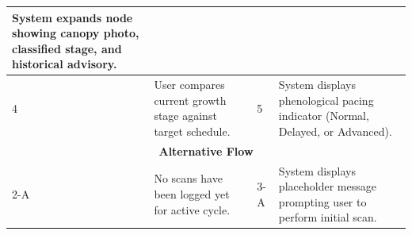 \documentclass{FastFyp}
\begin{document}
\begin{table}[!ht]
\begin{tabular}{|lllll|}
  \multicolumn{1}{p{5.6cm}|}{System expands node showing canopy photo, classified stage, and historical advisory.} \\ \hline
\multicolumn{1}{|p{0.8cm}|}{4} &
  \multicolumn{2}{p{6.0cm}|}{User compares current growth stage against target schedule.} &
  \multicolumn{1}{p{0.8cm}|}{5} &
  \multicolumn{1}{p{5.6cm}|}{System displays phenological pacing indicator (Normal, Delayed, or Advanced).} \\ \hline
\multicolumn{5}{|c|}{\textbf{Alternative Flow}} \\ \hline
\multicolumn{1}{|p{0.8cm}|}{2-A} &
  \multicolumn{2}{p{6.0cm}|}{No scans have been logged yet for active cycle.} &
  \multicolumn{1}{p{0.8cm}|}{3-A} &
  \multicolumn{1}{p{5.6cm}|}{System displays placeholder message prompting user to perform initial scan.} \\ \hline
\end{tabular}
\end{table}
\end{document}
